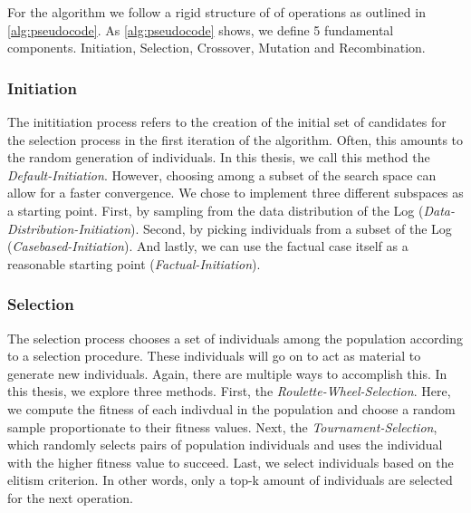 \documentclass[./../../paper.tex]{subfiles}
\begin{document}
For the algorithm we follow a rigid structure of of operations as outlined in \autoref{alg:pseudocode}. As \autoref{alg:pseudocode} shows, we define 5 fundamental components. Initiation, Selection, Crossover, Mutation and Recombination.

\subsubsection{Initiation}
The inititiation process refers to the creation of the initial set of candidates for the selection process in the first iteration of the algorithm. Often, this amounts to the random generation of individuals. In this thesis, we call this method the \emph{Default-Initiation}. However, choosing among a subset of the search space can allow for a faster convergence. We chose to implement three different subspaces as a starting point. First, by sampling from the data distribution of the Log (\emph{Data-Distribution-Initiation}). Second, by picking individuals from a subset of the Log (\emph{Casebased-Initiation}). And lastly, we can use the factual case itself as a reasonable starting point (\emph{Factual-Initiation}).   

\subsubsection{Selection}
The selection process chooses a set of individuals among the population according to a selection procedure. These individuals will go on to act as material to generate new individuals. Again, there are multiple ways to accomplish this. In this thesis, we explore three methods. First, the \emph{Roulette-Wheel-Selection}. Here, we compute the fitness of each indivdual in the population and choose a random sample proportionate to their fitness values. Next, the \emph{Tournament-Selection}, which randomly selects pairs of population individuals and uses the individual with the higher fitness value to succeed. Last, we select individuals based on the elitism criterion. In other words, only a top-k amount of individuals are selected for the next operation.
\end{document}

